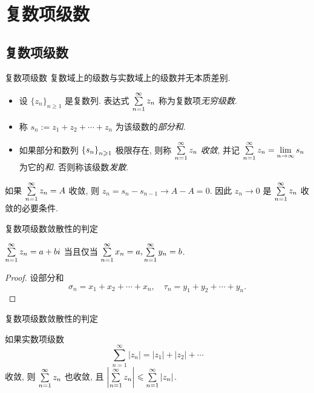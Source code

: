 \section{复数项级数}

\subsection{复数项级数}
\begin{frame}{复数项级数}
	\onslide<+->
	复数域上的级数与实数域上的级数并无本质差别.

	\onslide<+->
	\begin{definition}
		\begin{itemize}
			\item 设 $\{z_n\}_{n\ge1}$ 是复数列. 表达式 $\sum\limits_{n=1}^\infty z_n$ 称为复数项\emph{无穷级数}.
			\item 称 $s_n:=z_1+z_2+\cdots+z_n$ 为该级数的\emph{部分和}.
			\item 如果部分和数列 ${\left\{s_n\right\}}_{n\geqslant 1}$ 极限存在, 则称 $\sum\limits_{n=1}^\infty z_n$ \emph{收敛}, 并记 $\sum\limits_{n=1}^\infty z_n=\lim\limits_{n\to\infty}s_n$ 为它的\emph{和}. 否则称该级数\emph{发散}.
		\end{itemize}
	\end{definition}

	\onslide<+->
	如果 $\sum\limits_{n=1}^\infty z_n=A$ 收敛, 则 $z_n=s_n-s_{n-1}\to A-A=0$.
	\onslide<+->
	因此 \alert{$z_n\to0$ 是 $\sum\limits_{n=1}^\infty z_n$ 收敛的必要条件}.
\end{frame}


\begin{frame}{复数项级数敛散性的判定}
	\beqskip{7pt}
	\onslide<+->
	\begin{theorem}
		$\sum\limits_{n=1}^\infty z_n=a+bi$ 当且仅当 $\sum\limits_{n=1}^\infty x_n=a,\sum\limits_{n=1}^\infty y_n=b$.
	\end{theorem}

	\onslide<+->
	\begin{proof}
		设部分和
		\[\sigma_n=x_1+x_2+\cdots+x_n,\quad
			\tau_n=y_1+y_2+\cdots+y_n.\]
		\onslide<+->{于是命题得证.\qedhere}
	\end{proof}
	\endgroup
\end{frame}


\begin{frame}{复数项级数敛散性的判定}
	\onslide<+->
	\begin{theorem}
		如果实数项级数
		\[\sum_{n=1}^\infty|z_n|=|z_1|+|z_2|+\cdots\]
		收敛, 则 $\sum\limits_{n=1}^\infty z_n$ 也收敛, 且 $\left|\sum\limits_{n=1}^\infty z_n\right|\leqslant\sum\limits_{n=1}^\infty |z_n|$.
	\end{theorem}
\end{frame}


